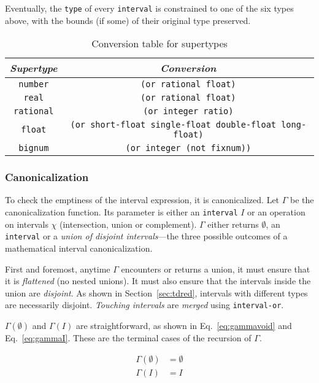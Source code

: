 \documentclass[format=sigconf]{acmart}
\newcommand\code[2][\small]{\sloppy\texttt{#1#2}}
\theoremstyle{definition}
\begin{document}
Eventually, the \code{type} of every \code{interval} is constrained to one of
the six types above, with the bounds (if some) of their original type preserved.

\begin{table}
  \centering
  \begin{tabular}{|c|c|}
    \hline
    \emph{Supertype} & \emph{Conversion} \\
    \hline
    \code{number} & \code{(or rational float)} \\
    \code{real} & \code{(or rational float)} \\
    \code{rational} & \code{(or integer ratio)} \\
    \code{float} & \code[\scriptsize]{(or short-float single-float double-float long-float)} \\
    \code{bignum} & \code{(or integer (not fixnum))} \\
    \hline
  \end{tabular}
  \caption{Conversion table for supertypes}
  \label{tab:numequiv}
\end{table}

\subsubsection{Canonicalization}
To check the emptiness of the interval expression, it is canonicalized. Let
$\Gamma$ be the canonicalization function. Its parameter is either an
\code{interval} $I$ or an operation on intervals $\chi$ (intersection, union or
complement). $\Gamma$ either returns $\emptyset$, an \code{interval} or a
\emph{union of disjoint intervals}---the three possible outcomes of a
mathematical interval canonicalization.

First and foremost, anytime $\Gamma$ encounters or returns a union, it must
ensure that it is \emph{flattened} (no nested unions). It must also ensure that
the intervals inside the union are \emph{disjoint}. As shown in
Section~\ref{sec:tdred}, intervals with different types are necessarily
disjoint. \emph{Touching intervals} \cite{baker1992} are \emph{merged} using
\code{interval-or}.

$\Gamma(\emptyset)$ and $\Gamma(I)$ are straightforward, as shown in
Eq.~\ref{eq:gammavoid} and Eq.~\ref{eq:gammaI}. These are the terminal cases of
the recursion of $\Gamma$.

\begin{align}
  \Gamma(\emptyset) &= \emptyset \label{eq:gammavoid}\tag{end-$\emptyset$}\\
  \Gamma(I) &= I \label{eq:gammaI}\tag{end-$I$}
\end{align}
\end{document}
